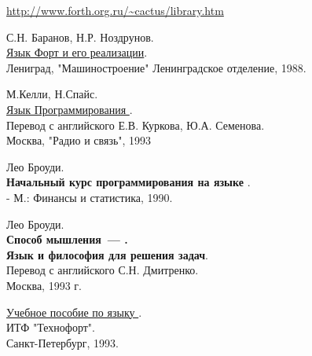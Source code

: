 \clearpage
{}
\begin{thebibliography}{99}

    \url{http://www.forth.org.ru/~cactus/library.htm}

    С.Н. Баранов, Н.Р. Ноздрунов.\\
    \href{http://www.forth.org.ru/~cactus/files/baranov2.rar}{Язык Форт и его реализации}.\\
    Лениград, "Машиностроение" Ленинградское отделение, 1988.

    М.Келли, Н.Спайс.\\
    \href{http://www.forth.org.ru/~cactus/files/kelly.rar}{Язык Программирования \F}.\\
    Перевод с английского Е.В. Куркова, Ю.А. Семенова.\\
    Москва, "Радио и связь", 1993

    Лео Броуди.\\
    \textbf{Начальный курс программирования на языке \F}.\\
    - М.: Финансы и статистика, 1990.

    Лео Броуди.\\
    \textbf{Способ мышления\ --- \F.\\Язык и философия для решения задач}.\\
    Перевод с английского С.Н. Дмитренко.\\
    Москва, 1993 г.

    \href{http://www.forth.org.ru/~TechnoForth/book.rar}{Учебное пособие по языку \F}.\\
    ИТФ "Технофорт".\\
    Санкт-Петербург, 1993.

\end{thebibliography}
